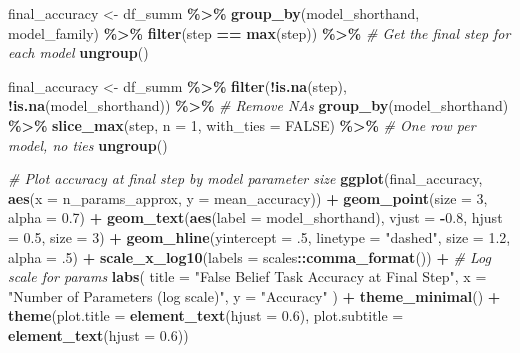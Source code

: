 \documentclass[
]{article}
\newenvironment{Shaded}{\begin{snugshade}}{\end{snugshade}}
\newcommand{\AttributeTok}[1]{\textcolor[rgb]{0.13,0.29,0.53}{#1}}
\newcommand{\CommentTok}[1]{\textcolor[rgb]{0.56,0.35,0.01}{\textit{#1}}}
\newcommand{\ConstantTok}[1]{\textcolor[rgb]{0.56,0.35,0.01}{#1}}
\newcommand{\DecValTok}[1]{\textcolor[rgb]{0.00,0.00,0.81}{#1}}
\newcommand{\FloatTok}[1]{\textcolor[rgb]{0.00,0.00,0.81}{#1}}
\newcommand{\FunctionTok}[1]{\textcolor[rgb]{0.13,0.29,0.53}{\textbf{#1}}}
\newcommand{\NormalTok}[1]{#1}
\newcommand{\OtherTok}[1]{\textcolor[rgb]{0.56,0.35,0.01}{#1}}
\newcommand{\SpecialCharTok}[1]{\textcolor[rgb]{0.81,0.36,0.00}{\textbf{#1}}}
\newcommand{\StringTok}[1]{\textcolor[rgb]{0.31,0.60,0.02}{#1}}
\begin{document}
\begin{Shaded}
\begin{Highlighting}[]
\NormalTok{final\_accuracy }\OtherTok{\textless{}{-}}\NormalTok{ df\_summ }\SpecialCharTok{\%\textgreater{}\%}
  \FunctionTok{group\_by}\NormalTok{(model\_shorthand, model\_family) }\SpecialCharTok{\%\textgreater{}\%}
  \FunctionTok{filter}\NormalTok{(step }\SpecialCharTok{==} \FunctionTok{max}\NormalTok{(step)) }\SpecialCharTok{\%\textgreater{}\%}  \CommentTok{\# Get the final step for each model}
  \FunctionTok{ungroup}\NormalTok{()}

\NormalTok{final\_accuracy }\OtherTok{\textless{}{-}}\NormalTok{ df\_summ }\SpecialCharTok{\%\textgreater{}\%}
  \FunctionTok{filter}\NormalTok{(}\SpecialCharTok{!}\FunctionTok{is.na}\NormalTok{(step), }\SpecialCharTok{!}\FunctionTok{is.na}\NormalTok{(model\_shorthand)) }\SpecialCharTok{\%\textgreater{}\%}  \CommentTok{\# Remove NAs}
  \FunctionTok{group\_by}\NormalTok{(model\_shorthand) }\SpecialCharTok{\%\textgreater{}\%}
  \FunctionTok{slice\_max}\NormalTok{(step, }\AttributeTok{n =} \DecValTok{1}\NormalTok{, }\AttributeTok{with\_ties =} \ConstantTok{FALSE}\NormalTok{) }\SpecialCharTok{\%\textgreater{}\%}  \CommentTok{\# One row per model, no ties}
  \FunctionTok{ungroup}\NormalTok{()}

\CommentTok{\# Plot accuracy at final step by model parameter size}
\FunctionTok{ggplot}\NormalTok{(final\_accuracy, }\FunctionTok{aes}\NormalTok{(}\AttributeTok{x =}\NormalTok{ n\_params\_approx, }\AttributeTok{y =}\NormalTok{ mean\_accuracy)) }\SpecialCharTok{+}
  \FunctionTok{geom\_point}\NormalTok{(}\AttributeTok{size =} \DecValTok{3}\NormalTok{, }\AttributeTok{alpha =} \FloatTok{0.7}\NormalTok{) }\SpecialCharTok{+}
  \FunctionTok{geom\_text}\NormalTok{(}\FunctionTok{aes}\NormalTok{(}\AttributeTok{label =}\NormalTok{ model\_shorthand), }\AttributeTok{vjust =} \SpecialCharTok{{-}}\FloatTok{0.8}\NormalTok{, }\AttributeTok{hjust =} \FloatTok{0.5}\NormalTok{, }\AttributeTok{size =} \DecValTok{3}\NormalTok{) }\SpecialCharTok{+}
  \FunctionTok{geom\_hline}\NormalTok{(}\AttributeTok{yintercept =}\NormalTok{ .}\DecValTok{5}\NormalTok{, }\AttributeTok{linetype =} \StringTok{"dashed"}\NormalTok{,}
             \AttributeTok{size =} \FloatTok{1.2}\NormalTok{, }\AttributeTok{alpha =}\NormalTok{ .}\DecValTok{5}\NormalTok{) }\SpecialCharTok{+}
  \FunctionTok{scale\_x\_log10}\NormalTok{(}\AttributeTok{labels =}\NormalTok{ scales}\SpecialCharTok{::}\FunctionTok{comma\_format}\NormalTok{()) }\SpecialCharTok{+}  \CommentTok{\# Log scale for params}
  \FunctionTok{labs}\NormalTok{(}
    \AttributeTok{title =} \StringTok{"False Belief Task Accuracy at Final Step"}\NormalTok{,}
    \AttributeTok{x =} \StringTok{"Number of Parameters (log scale)"}\NormalTok{,}
    \AttributeTok{y =} \StringTok{"Accuracy"}
\NormalTok{  ) }\SpecialCharTok{+}
  \FunctionTok{theme\_minimal}\NormalTok{() }\SpecialCharTok{+}
  \FunctionTok{theme}\NormalTok{(}\AttributeTok{plot.title =} \FunctionTok{element\_text}\NormalTok{(}\AttributeTok{hjust =} \FloatTok{0.6}\NormalTok{),}
        \AttributeTok{plot.subtitle =} \FunctionTok{element\_text}\NormalTok{(}\AttributeTok{hjust =} \FloatTok{0.6}\NormalTok{))}
\end{Highlighting}
\end{Shaded}
\end{document}
